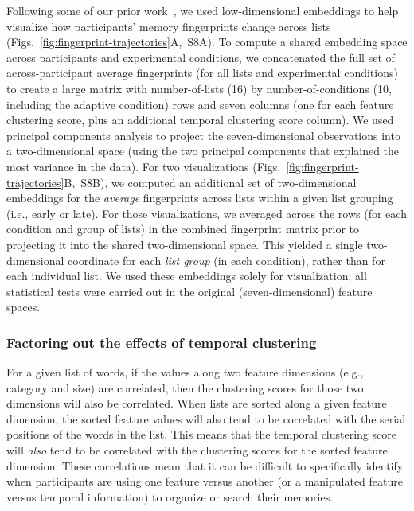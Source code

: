 \documentclass[11pt]{article}
\newcommand{\fingerprintTrajectoryRandom}{S8}
\begin{document}
Following some of our prior work~\citep{FitzEtal23, HeusEtal18a, HeusEtal21,
MannEtal22}, we used low-dimensional embeddings to help visualize how
participants' memory fingerprints change across lists
(Figs.~\ref{fig:fingerprint-trajectories}A,~\fingerprintTrajectoryRandom A). To
compute a shared embedding space across participants and experimental
conditions, we concatenated the full set of across-participant average
fingerprints (for all lists and experimental conditions) to create a large
matrix with number-of-lists (16) by number-of-conditions (10, including the
adaptive condition) rows and seven columns (one for each feature clustering
score, plus an additional temporal clustering score column). We used principal
components analysis to project the seven-dimensional observations into a
two-dimensional space (using the two principal components that explained the
most variance in the data). For two visualizations
(Figs.~\ref{fig:fingerprint-trajectories}B,~\fingerprintTrajectoryRandom B), we
computed an additional set of two-dimensional embeddings for the
\textit{average} fingerprints across lists within a given list grouping (i.e.,
early or late). For those visualizations, we averaged across the rows (for each
condition and group of lists) in the combined fingerprint matrix prior to
projecting it into the shared two-dimensional space. This yielded a single
two-dimensional coordinate for each \textit{list group} (in each condition),
rather than for each individual list. We used these embeddings solely for
visualization; all statistical tests were carried out in the original
(seven-dimensional) feature spaces.

\subsubsection*{Factoring out the effects of temporal clustering}

For a given list of words, if the values along two feature dimensions (e.g.,
category and size) are correlated, then the clustering scores for those two
dimensions will also be correlated. When lists are sorted along a given feature
dimension, the sorted feature values will also tend to be correlated with the
serial positions of the words in the list. This means that the temporal
clustering score will \textit{also} tend to be correlated with the clustering
scores for the sorted feature dimension. These correlations mean that it can be
difficult to specifically identify when participants are using one feature
versus another (or a manipulated feature versus temporal information) to
organize or search their memories.
\end{document}

